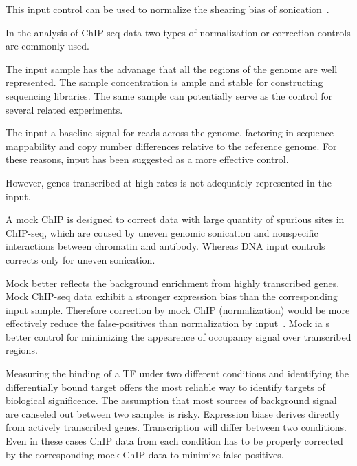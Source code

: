 This input control can be used to normalize the shearing bias of sonication~\cite{kharchenko2008design}.

In the analysis of ChIP-seq data two types of normalization or correction controls are commonly used.

The input sample has the advanage that all the regions of the genome are well represented.
The sample concentration is ample and stable for constructing sequencing libraries.
The same sample can potentially serve as the control for several related experiments.

The input a baseline signal for reads across the genome, factoring in sequence mappability and copy number differences relative to the reference genome.
For these reasons, input has been suggested as a more effective control.

However, genes transcribed at high rates is not adequately represented in the input.

A mock ChIP is designed to correct data with large quantity of spurious sites in ChIP-seq, which are coused by uneven genomic sonication and nonspecific interactions between chromatin and antibody.
Whereas DNA input controls corrects only for uneven sonication.

Mock better reflects the background enrichment from highly transcribed genes.
Mock ChIP-seq data exhibit a stronger expression bias than the corresponding input sample.
Therefore correction by mock ChIP (normalization) would be more effectively reduce the false-positives than normalization by input~\cite{park2013widespread}.
Mock ia s better control for minimizing the appearence of occupancy signal over transcribed regions.

Measuring the binding of a TF under two different conditions and identifying the differentially bound target offers the most reliable way to identify targets of biological significence.
The assumption that most sources of background signal are canseled out between two samples is risky.
Expression biase derives directly from actively transcribed genes.
Transcription will differ between two conditions.
Even in these cases ChIP data from each condition has to be properly corrected by the corresponding mock ChIP data to minimize false positives.

